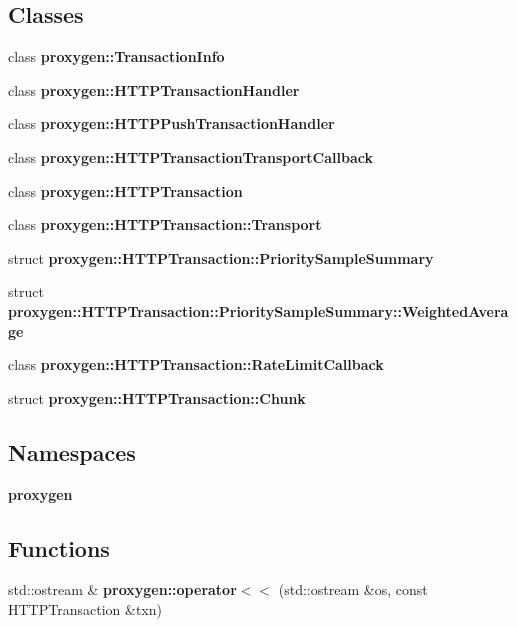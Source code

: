 \subsection*{Classes}
\begin{DoxyCompactItemize}
\item 
class {\bf proxygen\+::\+Transaction\+Info}
\item 
class {\bf proxygen\+::\+H\+T\+T\+P\+Transaction\+Handler}
\item 
class {\bf proxygen\+::\+H\+T\+T\+P\+Push\+Transaction\+Handler}
\item 
class {\bf proxygen\+::\+H\+T\+T\+P\+Transaction\+Transport\+Callback}
\item 
class {\bf proxygen\+::\+H\+T\+T\+P\+Transaction}
\item 
class {\bf proxygen\+::\+H\+T\+T\+P\+Transaction\+::\+Transport}
\item 
struct {\bf proxygen\+::\+H\+T\+T\+P\+Transaction\+::\+Priority\+Sample\+Summary}
\item 
struct {\bf proxygen\+::\+H\+T\+T\+P\+Transaction\+::\+Priority\+Sample\+Summary\+::\+Weighted\+Average}
\item 
class {\bf proxygen\+::\+H\+T\+T\+P\+Transaction\+::\+Rate\+Limit\+Callback}
\item 
struct {\bf proxygen\+::\+H\+T\+T\+P\+Transaction\+::\+Chunk}
\end{DoxyCompactItemize}
\subsection*{Namespaces}
\begin{DoxyCompactItemize}
\item 
 {\bf proxygen}
\end{DoxyCompactItemize}
\subsection*{Functions}
\begin{DoxyCompactItemize}
\item 
std\+::ostream \& {\bf proxygen\+::operator$<$$<$} (std\+::ostream \&os, const H\+T\+T\+P\+Transaction \&txn)
\end{DoxyCompactItemize}
